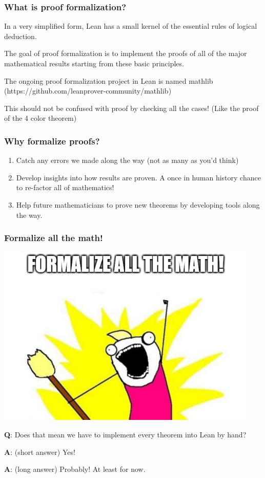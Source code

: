 \documentclass{beamer}
\begin{document}
\begin{frame}
    \frametitle{What is proof formalization?}
    In a very simplified form, Lean has a small kernel of the essential rules of logical deduction.

    \pause
    \vspace{20pt}
    The goal of proof formalization is to implement the proofs of all of the major mathematical results starting from these basic principles.

    \pause
    \vspace{20pt}
    The ongoing proof formalization project in Lean is named mathlib (https://github.com/leanprover-community/mathlib)

    \pause
    \vspace{20pt}
    This should not be confused with proof by checking all the cases! (Like the proof of the 4 color theorem)
\end{frame}

\begin{frame}
    \frametitle{Why formalize proofs?}
    \begin{enumerate}
        \item<1-> Catch any errors we made along the way (not as many as you'd think)
        \item<2-> Develop insights into how results are proven. A once in human history chance to re-factor all of mathematics!
        \item<3-> Help future mathematicians to prove new theorems by developing tools along the way.
    \end{enumerate}
\end{frame}

\begin{frame}
    \frametitle{Formalize all the math!}
    \begin{center}
    \includegraphics[scale=.35]{img/formalize.png}
    \end{center}
    {\bf Q}: Does that mean we have to implement every theorem into Lean by hand?
    \pause

    {\bf A}: (short answer) Yes!

    \pause
    {\bf A}: (long answer) Probably! At least for now.
\end{frame}
\end{document}
